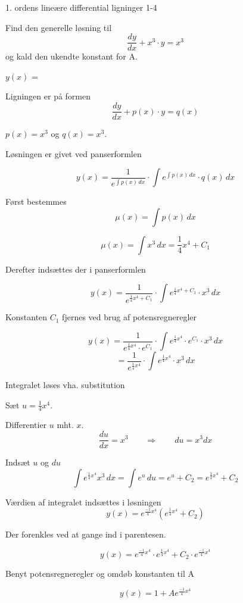 \documentclass{article}
\begin{document}
\newpage

\begin{exercise}{1. ordens lineære differential ligninger 1-4}


Find den generelle løsning til
\[
\frac{dy}{dx} + x^3 \cdot y = x^3
\]
og kald den ukendte konstant for A.

$y(x)$ = 



\hint

Ligningen er på formen
\[
\frac{dy}{dx} + p(x) \cdot y = q(x)
\]

\hint

$p(x)=x^3$ og $q(x)=x^3$.

\hint

Løsningen er givet ved panserformlen


\hint

\[
y(x) = \frac{1}{e^{\int p(x) \, dx}} \cdot \int e^{\int p(x) \, dx} \cdot q(x) \, dx
\]

\hint

Først bestemmes
\[
\mu(x) = \int p(x) \, dx
\]

\hint
\[
\mu(x) = \int x^3 \, dx = \frac{1}{4} x^4 + C_1
\]

\hint
Derefter indsættes der i panserformlen

\hint

\[
y(x) = \frac{1}{e^{\frac{1}{4}x^4 + C_1}} \cdot \int e^{\frac{1}{4}x^4 + C_1} \cdot x^3 \, dx
\]


\hint

Konstanten $C_1$ fjernes ved brug af potensregneregler

\hint
\[
y(x) = \frac{1}{e^{\frac{1}{4}x^4} \cdot e^{C_1}} \cdot \int e^{\frac{1}{4}x^4} \cdot e^{C_1} \cdot x^3 \, dx
\]
\[
= \frac{1}{e^{\frac{1}{4}x^4}} \cdot \int e^{\frac{1}{4}x^4} \cdot x^3 \, dx
\]

\hint

Integralet løses vha. substitution


\hint
Sæt $u = \frac{1}{4}x^4$.

\hint

Differentier $u$ mht. $x$.
\[
\frac{du}{dx} = x^3 \qquad\Rightarrow \qquad du = x^3 dx
\]

\hint
Indsæt $u$ og $du$
\[
\int e^{\frac{1}{4}x^4}x^3 \, dx = \int e^{u} \, du = e^{u} + C_2 = e^{\frac{1}{4}x^4} + C_2
\]

\hint

Værdien af integralet indsættes i løsningen
\[
y(x) = e^{\frac{-1}{4}x^4} \left( e^{\frac{1}{4}x^4}+ C_2\right)
\]

\hint

Der forenkles ved at gange ind i parentesen.

\hint
\[
y(x) = e^{\frac{-1}{4}x^4} \cdot e^{\frac{1}{4}x^4} + C_2 \cdot e^{\frac{-1}{4}x^4}
\]

\hint

Benyt potensregneregler og omdøb konstanten til A

\hint
\[
y(x) = 1 + A e^{\frac{-1}{4}x^4}
\]


\end{exercise}
\end{document}
